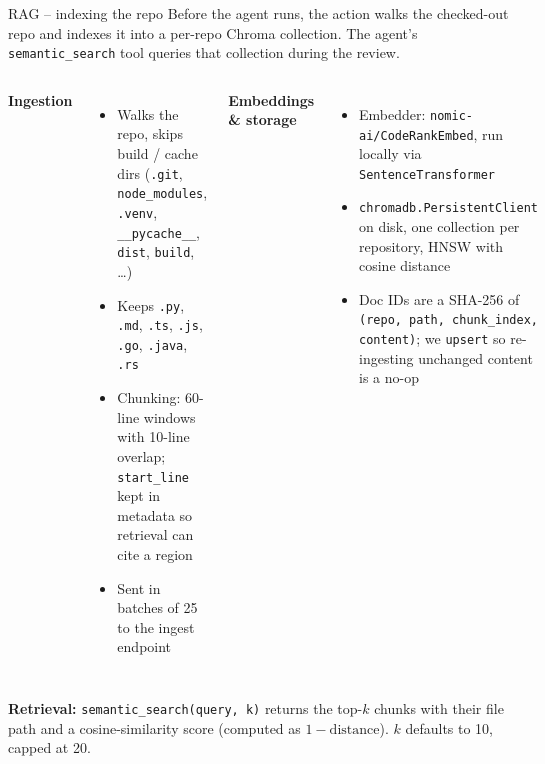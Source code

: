 \documentclass[10pt,aspectratio=169]{beamer}
\begin{document}
\begin{frame}{RAG -- indexing the repo}
  \footnotesize Before the agent runs, the action walks the checked-out repo and indexes it into
  a per-repo Chroma collection. The agent's \texttt{semantic\_search} tool queries
  that collection during the review.
  \vspace{0.4em}
  \begin{columns}[T,onlytextwidth]
      \footnotesize\textbf{Ingestion}
      \begin{itemize}\scriptsize
        \item Walks the repo, skips build / cache dirs (\texttt{.git}, \texttt{node\_modules}, \texttt{.venv}, \texttt{\_\_pycache\_\_}, \texttt{dist}, \texttt{build}, \dots)
        \item Keeps \texttt{.py}, \texttt{.md}, \texttt{.ts}, \texttt{.js}, \texttt{.go}, \texttt{.java}, \texttt{.rs}
        \item \alert{Chunking}: 60-line windows with 10-line overlap; \texttt{start\_line} kept in metadata so retrieval can cite a region
        \item Sent in batches of 25 to the ingest endpoint
      \end{itemize}
      \footnotesize\textbf{Embeddings \& storage}
      \begin{itemize}\scriptsize
        \item Embedder: \texttt{nomic-ai/CodeRankEmbed}, run locally via \texttt{SentenceTransformer}
        \item \texttt{chromadb.PersistentClient} on disk, one collection per repository, HNSW with cosine distance
        \item Doc IDs are a SHA-256 of \texttt{(repo, path, chunk\_index, content)}; we \texttt{upsert} so re-ingesting unchanged content is a no-op
      \end{itemize}
  \end{columns}
  \vspace{0.5em}

  \scriptsize\textbf{Retrieval:} \texttt{semantic\_search(query, k)} returns the top-$k$ chunks with
  their file path and a cosine-similarity score (computed as $1 - \text{distance}$). $k$ defaults to 10,
  capped at 20.
  \vspace{0.4em}
\end{frame}
\end{document}

